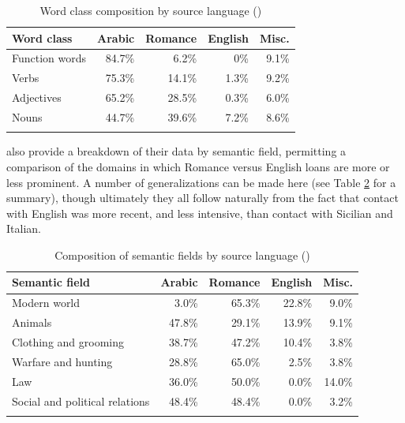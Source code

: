 \documentclass[output=paper]{langsci/langscibook}
\begin{document}
\begin{table}[H]
\caption{Word class composition by source language (\citealt[328]{comriespagnol2016})}
\label{tab:comriespagnol}
\begin{tabular}{lllll}
\lsptoprule
Word class & Arabic & Romance & English & Misc.\\
\midrule
Function words & \multicolumn{1}{r}{84.7\%} & \multicolumn{1}{r}{6.2\%} & \multicolumn{1}{r}{0\%} & \multicolumn{1}{r}{9.1\%} \\
Verbs & \multicolumn{1}{r}{75.3\%} & \multicolumn{1}{r}{14.1\%} & \multicolumn{1}{r}{1.3\%} & \multicolumn{1}{r}{9.2\%} \\
Adjectives & \multicolumn{1}{r}{65.2\%} & \multicolumn{1}{r}{28.5\%} & \multicolumn{1}{r}{0.3\%} & \multicolumn{1}{r}{6.0\%} \\
Nouns & \multicolumn{1}{r}{44.7\%} & \multicolumn{1}{r}{39.6\%} & \multicolumn{1}{r}{7.2\%} & \multicolumn{1}{r}{8.6\%} \\
\lspbottomrule
\end{tabular}
\end{table}

\citet{comriespagnol2016} also provide a breakdown of their data by semantic field, permitting a comparison of the domains in which Romance versus English loans are more or less prominent. A number of generalizations can be made here (see Table \ref{tab:comriespagnolsemantic} for a summary), though ultimately they all follow naturally from the fact that contact with English was more recent, and less intensive, than contact with Sicilian and Italian. 

\begin{table}[H]
\caption{Composition of semantic fields by source language (\citealt[327]{comriespagnol2016})}
\label{tab:comriespagnolsemantic}
\begin{tabular}{lllll}
\lsptoprule
Semantic field & Arabic & Romance & English & Misc.\\
\midrule
Modern world & \multicolumn{1}{r}{3.0\%} & \multicolumn{1}{r}{65.3\%} & \multicolumn{1}{r}{22.8\%} & \multicolumn{1}{r}{9.0\%} \\
Animals & \multicolumn{1}{r}{47.8\%} & \multicolumn{1}{r}{29.1\%} & \multicolumn{1}{r}{13.9\%} & \multicolumn{1}{r}{9.1\%} \\
Clothing and grooming & \multicolumn{1}{r}{38.7\%} & \multicolumn{1}{r}{47.2\%} & \multicolumn{1}{r}{10.4\%} & \multicolumn{1}{r}{3.8\%} \\
Warfare and hunting & \multicolumn{1}{r}{28.8\%} & \multicolumn{1}{r}{65.0\%} & \multicolumn{1}{r}{2.5\%} & \multicolumn{1}{r}{3.8\%} \\
Law & \multicolumn{1}{r}{36.0\%} & \multicolumn{1}{r}{50.0\%} & \multicolumn{1}{r}{0.0\%} & \multicolumn{1}{r}{14.0\%} \\
Social and political relations & \multicolumn{1}{r}{48.4\%} & \multicolumn{1}{r}{48.4\%} & \multicolumn{1}{r}{0.0\%} & \multicolumn{1}{r}{3.2\%} \\
\lspbottomrule
\end{tabular}
\end{table}
\end{document}
